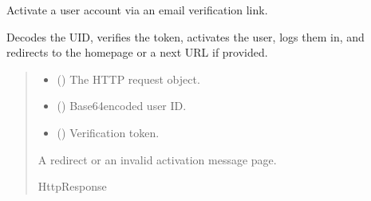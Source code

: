 \documentclass[letterpaper,10pt,english]{sphinxmanual}
\begin{document}
\begin{fulllineitems}
\label{\detokenize{users:users.views.activate}}
\pysigstartsignatures
\pysiglinewithargsret
{}
{\sphinxparamcomma {}\sphinxparamcomma {}}
{}
\pysigstopsignatures
\sphinxAtStartPar
Activate a user account via an email verification link.

\sphinxAtStartPar
Decodes the UID, verifies the token, activates the user, logs them in,
and redirects to the homepage or a next URL if provided.
\begin{quote}\begin{description}
\begin{itemize}
\item {} 
\sphinxAtStartPar
{} () \textendash{} The HTTP request object.

\item {} 
\sphinxAtStartPar
{} () \textendash{} Base64\sphinxhyphen{}encoded user ID.

\item {} 
\sphinxAtStartPar
{} () \textendash{} Verification token.

\end{itemize}

\sphinxAtStartPar
A redirect or an invalid activation message page.

\sphinxAtStartPar
HttpResponse

\end{description}\end{quote}

\end{fulllineitems}

\end{document}
